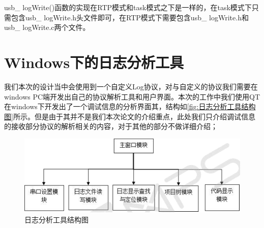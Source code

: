 usb\_ logWrite()函数的实现在RTP模式和task模式之下是一样的，在task模式下只需包含usb\_ logWrite.h头文件即可，在RTP模式下需要包含usb\_ logWrite.h和usb\_ logWrite.c两个文件。


\section{Windows下的日志分析工具}
	
	我们本次的设计当中会使用到一个自定义Log协议，对与自定义的协议我们需要在windows PC端开发出自己的协议解析工具和用户界面。本次的工作中我们使用QT在windows下开发出了一个调试信息的分析界面其，结构如\autoref{fig:日志分析工具结构图}所示。但是由于其并不是我们本次论文的介绍重点，此处我们只介绍调试信息的接收部分协议的解析相关的内容，对于其他的部分不做详细介绍；
\begin{figure}[!h]
\centering
\includegraphics[width=1.0\textwidth]{./graphics/routonLog-system-structure.pdf}
\caption{日志分析工具结构图}\label{fig:日志分析工具结构图}
\end{figure}

